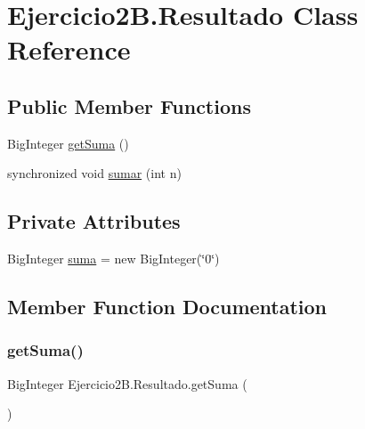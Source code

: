 \hypertarget{class_ejercicio2_b_1_1_resultado}{}\section{Ejercicio2\+B.\+Resultado Class Reference}
\label{class_ejercicio2_b_1_1_resultado}
\subsection*{Public Member Functions}
\begin{DoxyCompactItemize}
\item 
Big\+Integer \mbox{\hyperlink{class_ejercicio2_b_1_1_resultado_ae67b1d27d795790dbc6f00758f5710cc}{get\+Suma}} ()
\item 
synchronized void \mbox{\hyperlink{class_ejercicio2_b_1_1_resultado_ae929ed7dc91fea822e0b9807ac130088}{sumar}} (int n)
\end{DoxyCompactItemize}
\subsection*{Private Attributes}
\begin{DoxyCompactItemize}
\item 
Big\+Integer \mbox{\hyperlink{class_ejercicio2_b_1_1_resultado_a4fe8f3cecd2e27923714cde5de400b5d}{suma}} = new Big\+Integer(\char`\"{}0\char`\"{})
\end{DoxyCompactItemize}


\subsection{Member Function Documentation}
\mbox{\label{class_ejercicio2_b_1_1_resultado_ae67b1d27d795790dbc6f00758f5710cc}} 
\subsubsection{\texorpdfstring{get\+Suma()}{getSuma()}}
{\footnotesize\ttfamily Big\+Integer Ejercicio2\+B.\+Resultado.\+get\+Suma (\begin{DoxyParamCaption}{ }\end{DoxyParamCaption})\hspace{0.3cm}{\ttfamily [inline]}}


